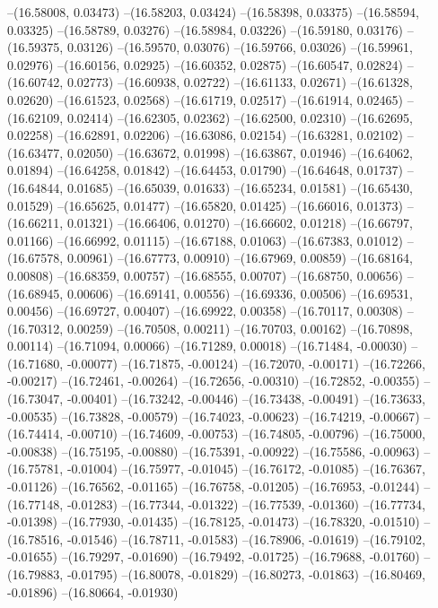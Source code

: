 --(16.58008, 0.03473)
--(16.58203, 0.03424)
--(16.58398, 0.03375)
--(16.58594, 0.03325)
--(16.58789, 0.03276)
--(16.58984, 0.03226)
--(16.59180, 0.03176)
--(16.59375, 0.03126)
--(16.59570, 0.03076)
--(16.59766, 0.03026)
--(16.59961, 0.02976)
--(16.60156, 0.02925)
--(16.60352, 0.02875)
--(16.60547, 0.02824)
--(16.60742, 0.02773)
--(16.60938, 0.02722)
--(16.61133, 0.02671)
--(16.61328, 0.02620)
--(16.61523, 0.02568)
--(16.61719, 0.02517)
--(16.61914, 0.02465)
--(16.62109, 0.02414)
--(16.62305, 0.02362)
--(16.62500, 0.02310)
--(16.62695, 0.02258)
--(16.62891, 0.02206)
--(16.63086, 0.02154)
--(16.63281, 0.02102)
--(16.63477, 0.02050)
--(16.63672, 0.01998)
--(16.63867, 0.01946)
--(16.64062, 0.01894)
--(16.64258, 0.01842)
--(16.64453, 0.01790)
--(16.64648, 0.01737)
--(16.64844, 0.01685)
--(16.65039, 0.01633)
--(16.65234, 0.01581)
--(16.65430, 0.01529)
--(16.65625, 0.01477)
--(16.65820, 0.01425)
--(16.66016, 0.01373)
--(16.66211, 0.01321)
--(16.66406, 0.01270)
--(16.66602, 0.01218)
--(16.66797, 0.01166)
--(16.66992, 0.01115)
--(16.67188, 0.01063)
--(16.67383, 0.01012)
--(16.67578, 0.00961)
--(16.67773, 0.00910)
--(16.67969, 0.00859)
--(16.68164, 0.00808)
--(16.68359, 0.00757)
--(16.68555, 0.00707)
--(16.68750, 0.00656)
--(16.68945, 0.00606)
--(16.69141, 0.00556)
--(16.69336, 0.00506)
--(16.69531, 0.00456)
--(16.69727, 0.00407)
--(16.69922, 0.00358)
--(16.70117, 0.00308)
--(16.70312, 0.00259)
--(16.70508, 0.00211)
--(16.70703, 0.00162)
--(16.70898, 0.00114)
--(16.71094, 0.00066)
--(16.71289, 0.00018)
--(16.71484, -0.00030)
--(16.71680, -0.00077)
--(16.71875, -0.00124)
--(16.72070, -0.00171)
--(16.72266, -0.00217)
--(16.72461, -0.00264)
--(16.72656, -0.00310)
--(16.72852, -0.00355)
--(16.73047, -0.00401)
--(16.73242, -0.00446)
--(16.73438, -0.00491)
--(16.73633, -0.00535)
--(16.73828, -0.00579)
--(16.74023, -0.00623)
--(16.74219, -0.00667)
--(16.74414, -0.00710)
--(16.74609, -0.00753)
--(16.74805, -0.00796)
--(16.75000, -0.00838)
--(16.75195, -0.00880)
--(16.75391, -0.00922)
--(16.75586, -0.00963)
--(16.75781, -0.01004)
--(16.75977, -0.01045)
--(16.76172, -0.01085)
--(16.76367, -0.01126)
--(16.76562, -0.01165)
--(16.76758, -0.01205)
--(16.76953, -0.01244)
--(16.77148, -0.01283)
--(16.77344, -0.01322)
--(16.77539, -0.01360)
--(16.77734, -0.01398)
--(16.77930, -0.01435)
--(16.78125, -0.01473)
--(16.78320, -0.01510)
--(16.78516, -0.01546)
--(16.78711, -0.01583)
--(16.78906, -0.01619)
--(16.79102, -0.01655)
--(16.79297, -0.01690)
--(16.79492, -0.01725)
--(16.79688, -0.01760)
--(16.79883, -0.01795)
--(16.80078, -0.01829)
--(16.80273, -0.01863)
--(16.80469, -0.01896)
--(16.80664, -0.01930)
